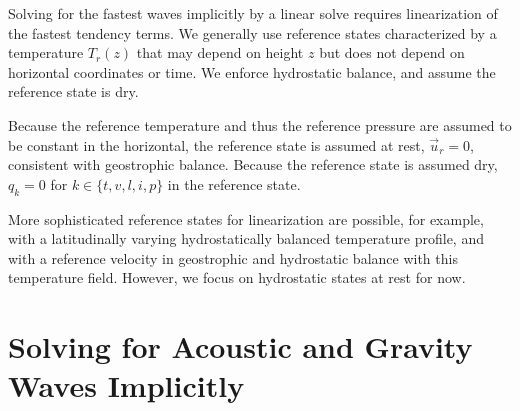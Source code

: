 \documentclass{report}
\numberwithin{equation}{section}
\begin{document}
Solving for the fastest waves implicitly by a linear solve requires linearization of the fastest tendency terms. We generally use reference states characterized by a temperature $T_r(z)$ that may depend on height $z$ but does not depend on horizontal coordinates or time. We enforce hydrostatic balance, and assume the reference state is dry.

Because the reference temperature and thus the reference pressure are assumed to be constant in the horizontal, the reference state is assumed at rest, $\vec{u}_r = 0$, consistent with geostrophic balance. Because the reference state is assumed dry, $q_k= 0$ for $k \in \{ t, v, l, i, p\}$ in the reference state.

More sophisticated reference states for linearization are possible, for example, with a latitudinally varying hydrostatically balanced temperature profile, and with a reference velocity in geostrophic and hydrostatic balance with this temperature field. However, we focus on hydrostatic states at rest for now. 
 
 \section{Solving for Acoustic and Gravity Waves Implicitly}
 \label{s:IMEX_general}
\end{document}
